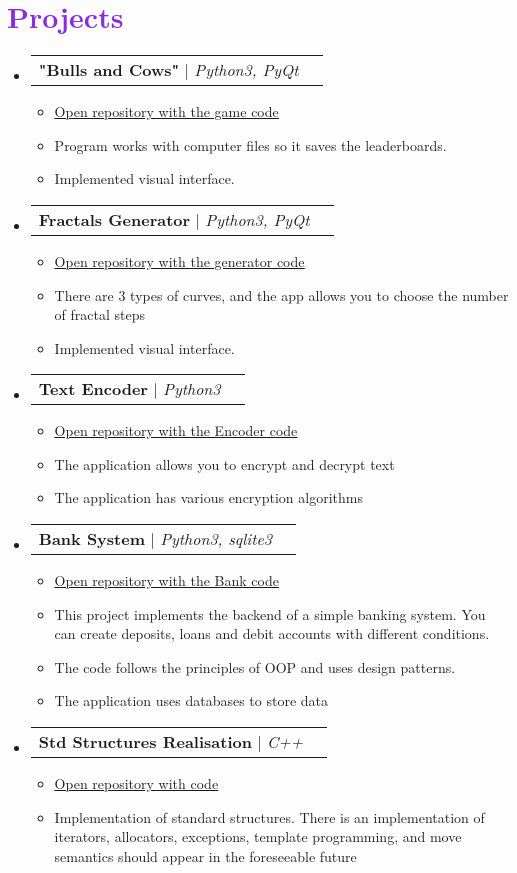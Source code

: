 \documentclass[letterpaper,11pt]{article}
\makeatletter
\newcommand{\resumeItem}[1]{
  \item\small{
    {#1 \vspace{-2pt}}
  }
}
\newcommand{\resumeProjectHeading}[2]{
    \item
    \begin{tabular*}{1.001\textwidth}{l@{\extracolsep{\fill}}r}
      \small#1 & \textbf{\small #2}\\
    \end{tabular*}\vspace{-7pt}
}
\newcommand{\resumeSubHeadingListStart}{\begin{itemize}[leftmargin=0.0in, label={}]}
\newcommand{\resumeSubHeadingListEnd}{\end{itemize}}
\newcommand{\resumeItemListStart}{\begin{itemize}}
\newcommand{\resumeItemListEnd}{\end{itemize}\vspace{-5pt}}
\makeatother
\begin{document}
\section{\textcolor{BlueViolet}{Projects}}
    \vspace{-5pt}
    \resumeSubHeadingListStart
      \resumeProjectHeading
          {\textbf{ "Bulls and Cows"} $|$ \emph{Python3, PyQt}}{}
          \resumeItemListStart
            \resumeItem{\href{https://github.com/dmsuty/My_projects/blob/main/cows_bulls.py}{\textcolor{Emerald}{\underline{Open repository with the game code}}}}
            \resumeItem{Program works with computer files so it saves the leaderboards.}
            \resumeItem{Implemented visual interface.}
          \resumeItemListEnd
          \vspace{-13pt}
      \resumeProjectHeading
          {\textbf{Fractals Generator} $|$ \emph{Python3, PyQt}}{}
          \resumeItemListStart
            \resumeItem{\href{https://github.com/dmsuty/My_projects/blob/main/snowflake.py}{\textcolor{Emerald}{\underline{Open repository with the generator code}}}}
            \resumeItem{There are 3 types of curves, and the app allows you to choose the number of fractal steps}
            \resumeItem{Implemented visual interface.}
          \resumeItemListEnd 
          \vspace{-13pt}
       \resumeProjectHeading
          {\textbf{Text Encoder} $|$ \emph{Python3}}{}
          \resumeItemListStart
            \resumeItem{\href{https://github.com/dmsuty/Text-Encoder}{\textcolor{Emerald}{\underline{Open repository with the Encoder code}}}}
            \resumeItem{The application allows you to encrypt and decrypt text}
            \resumeItem{The application has various encryption algorithms}
          \resumeItemListEnd 
          \vspace{-13pt}
      \resumeProjectHeading
          {\textbf{Bank System} $|$ \emph{Python3, sqlite3}}{}
          \resumeItemListStart
            \resumeItem{\href{https://github.com/dmsuty/Simple-Bank-System}{\textcolor{Emerald}{\underline{Open repository with the Bank code}}}}
            \resumeItem{This project implements the backend of a simple banking system. You can create deposits, loans and debit accounts with different conditions.}
            \resumeItem{The code follows the principles of OOP and uses design patterns.}
            \resumeItem{The application uses databases to store data}
          \resumeItemListEnd
          \vspace{-13pt}
      \resumeProjectHeading
        {\textbf{Std Structures Realisation} $|$ \emph{C++}}{}
          \resumeItemListStart
            \resumeItem{\href{https://github.com/dmsuty/std-containers}{\textcolor{Emerald}{\underline{Open repository with code}}}}
            \resumeItem{Implementation of standard structures. There is an implementation of iterators, allocators, exceptions, template programming, and move semantics should appear in the foreseeable future}
          \resumeItemListEnd
    \resumeSubHeadingListEnd
\vspace{-15pt}
\end{document}
